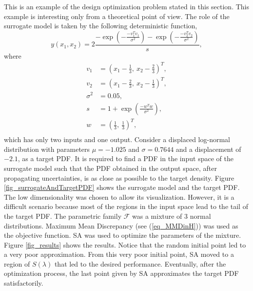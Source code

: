 \begin{example} \label{ex_twoModeSurrogate}
This is an example of the design optimization problem stated in this section. 
This example is interesting only from a theoretical point of view.
The role of the surrogate model is taken by the following deterministic function,
\begin{equation} \label{eq_surrogateExample1}
  y(x_1,x_2) = 
       2\frac{-\exp(-\frac{-v_1^Tv_1}{\sigma^2})-\exp(-\frac{-v_2^Tv_2}{\sigma^2})}{s},
\end{equation}
where
\begin{equation} \label{eq_surrogateExample1extra}
\begin{aligned} 
      v_1 &= (x_1-\frac{1}{3}, \ x_2-\frac{2}{3})^T, \\
      v_2 &= (x_1-\frac{2}{3}, \ x_2-\frac{1}{3})^T, \\
      \sigma^2 &= 0.05, \\
      s &= 1+\exp(\frac{-w^Tw}{\sigma^2}),\\
      w &= (\frac{1}{3}, \ \frac{1}{3})^T, \\
\end{aligned}
\end{equation} 
which has only two inputs and one output.
Consider a displaced log-normal distribution with parameters $\mu=-1.025$ and $\sigma = 0.7644$ and a displacement of $-2.1$, as a target PDF.
It is required to find a PDF in the input space of the surrogate model such that the PDF obtained in the output space, after propagating uncertainties, is as close as possible to the target density. 
Figure \ref{fig_surrogateAndTargetPDF} shows the surrogate model and the target PDF.
The low dimensionality was chosen to allow its visualization. %
However, it is a difficult scenario because most of the regions in the input space lead to the tail of the target PDF. %
The parametric family $\mathcal{F}$ was a mixture of 3 normal distributions.
Maximum Mean Discrepancy (see (\ref{eq_MMDinH})) was used as the objective function.
SA was used to optimize the parameters of the mixture.
Figure \ref{fig_results} shows the results.
Notice that the random initial point led to a very poor approximation.
From this very poor initial point, SA moved to a region of $S(\lambda)$ that led to the desired performance.
Eventually, after the optimization process, the last point given by SA approximates the target PDF satisfactorily.
\end{example}

